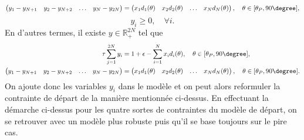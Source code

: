 $$\begin{pmatrix}
y_1-y_{N+1} & y_2-y_{N+2} & \hdots & y_N-y_{2N}
\end{pmatrix}
=
\begin{pmatrix}
x_1 d_1(\theta) & x_2 d_2(\theta) & \hdots & x_N d_N(\theta)
\end{pmatrix},
\quad \theta \in [\theta_P,90\degree],$$
$$y_i \geq 0, \quad \forall i.$$
En d'autres termes, il existe $y \in \mathbb{R}_{+}^{2N}$ tel que
\begin{align*}
\tau \sum_{j=1}^{2N}{y_i} & = 1+\epsilon-\sum_{i=1}^{N}{x_i d_i(\theta)}, \quad \theta \in [\theta_P,90\degree],\\
\begin{pmatrix}
y_1-y_{N+1} & y_2-y_{N+2} & \hdots & y_N-y_{2N}
\end{pmatrix}
& =
\begin{pmatrix}
x_1 d_1(\theta) & x_2 d_2(\theta) & \hdots & x_N d_N(\theta)
\end{pmatrix},
\quad \theta \in [\theta_P,90\degree].
\end{align*}
On ajoute donc les variables $y_i$ dans le modèle et on peut alors reformuler la contrainte de départ de la manière mentionnée ci-dessus. En effectuant la démarche ci-dessus pour les quatre sortes de contraintes du modèle de départ, on se retrouver avec un modèle plus robuste puis qu'il se base toujours sur le pire cas.
